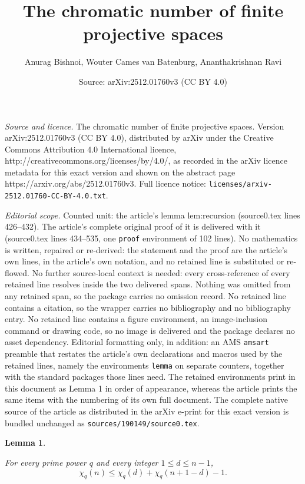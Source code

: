 \documentclass[10pt,a4paper]{amsart}
\title{The chromatic number of finite projective spaces}
\author{Anurag Bishnoi, Wouter Cames van Batenburg, Ananthakrishnan Ravi}
\date{Source: arXiv:2512.01760v3 (CC BY 4.0)}
\newtheorem{lemma}{Lemma}
\begin{document}
\maketitle

\noindent\emph{Source and licence.} The chromatic number of finite projective spaces. Version arXiv:2512.01760v3 (CC BY 4.0), distributed by arXiv under the Creative Commons Attribution 4.0 International licence, http://creativecommons.org/licenses/by/4.0/, as recorded in the arXiv licence metadata for this exact version and shown on the abstract page https://arxiv.org/abs/2512.01760v3. Full licence notice: \texttt{licenses/arxiv-2512.01760-CC-BY-4.0.txt}.\par\smallskip

\noindent\textit{Editorial scope.} Counted unit: the article's lemma lem:recursion (source0.tex lines 426--432). The article's complete original proof of it is delivered with it (source0.tex lines 434--535, one \texttt{proof} environment of 102 lines). No mathematics is written, repaired or re-derived: the statement and the proof are the article's own lines, in the article's own notation, and no retained line is substituted or re-flowed.  No further source-local context is needed: every cross-reference of every retained line resolves inside the two delivered spans.  Nothing was omitted from any retained span, so the package carries no omission record.  No retained line contains a citation, so the wrapper carries no bibliography and no bibliography entry.  No retained line contains a figure environment, an image-inclusion command or drawing code, so no image is delivered and the package declares no asset dependency.  Editorial formatting only, in addition: an AMS \texttt{amsart} preamble that restates the article's own declarations and macros used by the retained lines, namely the environments \texttt{lemma} on separate counters, together with the standard packages those lines need.  The retained environments print in this document as Lemma 1 in order of appearance, whereas the article prints the same items with the numbering of its own full document.  The complete native source of the article as distributed in the arXiv e-print for this exact version is bundled unchanged as \texttt{sources/190149/source0.tex}.
\begin{lemma}\label{lem:recursion}

For every prime power $q$ and every integer $1\le d\le n-1$,
\[
\chi_q(n)\le \chi_q(d)+ \chi_q(n+1-d)-1.
\]
\end{lemma}
\end{document}
